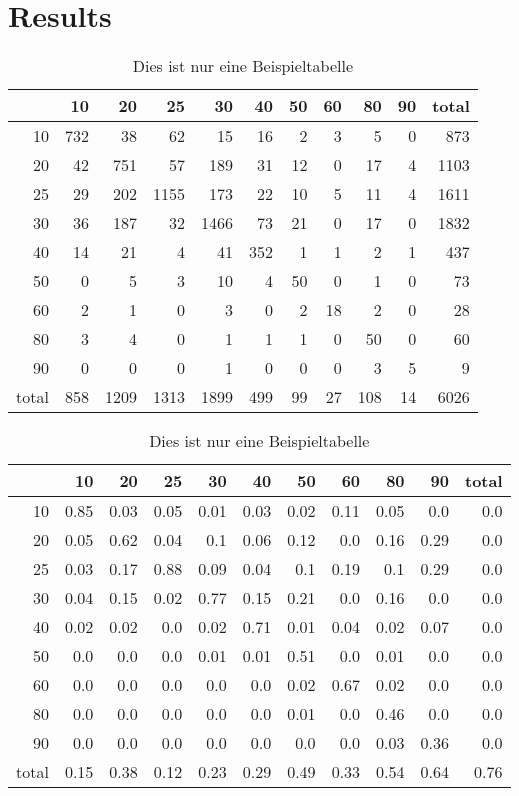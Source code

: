 \section{Results}
\label{sec:result}

\begin{table}
	\centering
	\caption{Dies ist nur eine Beispieltabelle}
	\label{tab:rt1}
	\begin{tabular}{r|rrrrrrrrr|r}
		   & 10 & 20 & 25 & 30 & 40 & 50 & 60 & 80 & 90 & total \\\hline
		10 & 732 & 38 & 62 & 15 & 16 & 2 & 3 & 5 & 0 & 873 \\ 
		20 & 42 & 751 & 57 & 189 & 31 & 12 & 0 & 17 & 4 & 1103 \\ 
		25 & 29 & 202 & 1155 & 173 & 22 & 10 & 5 & 11 & 4 & 1611 \\ 
		30 & 36 & 187 & 32 & 1466 & 73 & 21 & 0 & 17 & 0 & 1832 \\ 
		40 & 14 & 21 & 4 & 41 & 352 & 1 & 1 & 2 & 1 & 437 \\ 
		50 & 0 & 5 & 3 & 10 & 4 & 50 & 0 & 1 & 0 & 73 \\ 
		60 & 2 & 1 & 0 & 3 & 0 & 2 & 18 & 2 & 0 & 28 \\ 
		80 & 3 & 4 & 0 & 1 & 1 & 1 & 0 & 50 & 0 & 60 \\ 
		90 & 0 & 0 & 0 & 1 & 0 & 0 & 0 & 3 & 5 & 9 \\\hline 
		total & 858 & 1209 & 1313 & 1899 & 499 & 99 & 27 & 108 & 14 & 6026
	\end{tabular}
\end{table}

\begin{table}
	\centering
	\caption{Dies ist nur eine Beispieltabelle}
	\label{tab:rt2}
	\begin{tabular}{r|rrrrrrrrr|r}
		   & 10 & 20 & 25 & 30 & 40 & 50 & 60 & 80 & 90 & total \\\hline 
		10 & 0.85 & 0.03 & 0.05 & 0.01 & 0.03 & 0.02 & 0.11 & 0.05 & 0.0 & 0.0 \\ 
		20 & 0.05 & 0.62 & 0.04 & 0.1 & 0.06 & 0.12 & 0.0 & 0.16 & 0.29 & 0.0 \\ 
		25 & 0.03 & 0.17 & 0.88 & 0.09 & 0.04 & 0.1 & 0.19 & 0.1 & 0.29 & 0.0 \\ 
		30 & 0.04 & 0.15 & 0.02 & 0.77 & 0.15 & 0.21 & 0.0 & 0.16 & 0.0 & 0.0 \\ 
		40 & 0.02 & 0.02 & 0.0 & 0.02 & 0.71 & 0.01 & 0.04 & 0.02 & 0.07 & 0.0 \\ 
		50 & 0.0 & 0.0 & 0.0 & 0.01 & 0.01 & 0.51 & 0.0 & 0.01 & 0.0 & 0.0 \\ 
		60 & 0.0 & 0.0 & 0.0 & 0.0 & 0.0 & 0.02 & 0.67 & 0.02 & 0.0 & 0.0 \\ 
		80 & 0.0 & 0.0 & 0.0 & 0.0 & 0.0 & 0.01 & 0.0 & 0.46 & 0.0 & 0.0 \\ 
		90 & 0.0 & 0.0 & 0.0 & 0.0 & 0.0 & 0.0 & 0.0 & 0.03 & 0.36 & 0.0 \\\hline 
		total & 0.15 & 0.38 & 0.12 & 0.23 & 0.29 & 0.49 & 0.33 & 0.54 & 0.64 & 0.76
	\end{tabular}
\end{table}

